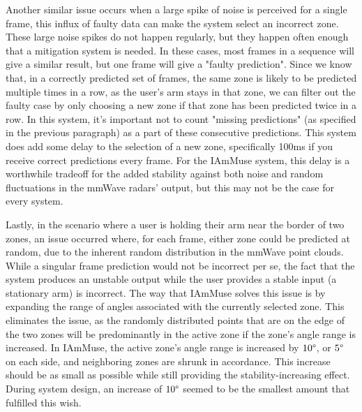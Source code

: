 Another similar issue occurs when a large spike of noise is perceived for a single frame, this influx of faulty data can make the system select an incorrect zone.
These large noise spikes do not happen regularly, but they happen often enough that a mitigation system is needed.
In these cases, most frames in a sequence will give a similar result, but one frame will give a "faulty prediction".
Since we know that, in a correctly predicted set of frames, the same zone is likely to be predicted multiple times in a row, as the user's arm stays in that zone, we can filter out the faulty case by only choosing a new zone if that zone has been predicted twice in a row.
In this system, it's important not to count "missing predictions" (as specified in the previous paragraph) as a part of these consecutive predictions.
This system does add some delay to the selection of a new zone, specifically 100ms if you receive correct predictions every frame. 
For the IAmMuse system, this delay is a worthwhile tradeoff for the added stability against both noise and random fluctuations in the mmWave radars' output, but this may not be the case for every system.

Lastly, in the scenario where a user is holding their arm near the border of two zones, an issue occurred where, for each frame, either zone could be predicted at random, due to the inherent random distribution in the mmWave point clouds.
While a singular frame prediction would not be incorrect per se, the fact that the system produces an unstable output while the user provides a stable input (a stationary arm) is incorrect.
The way that IAmMuse solves this issue is by expanding the range of angles associated with the currently selected zone.
This eliminates the issue, as the randomly distributed points that are on the edge of the two zones will be predominantly in the active zone if the zone's angle range is increased.
In IAmMuse, the active zone's angle range is increased by $10\degree$, or $5\degree$ on each side, and neighboring zones are shrunk in accordance.
This increase should be as small as possible while still providing the stability-increasing effect.
During system design, an increase of $10\degree$ seemed to be the smallest amount that fulfilled this wish.





